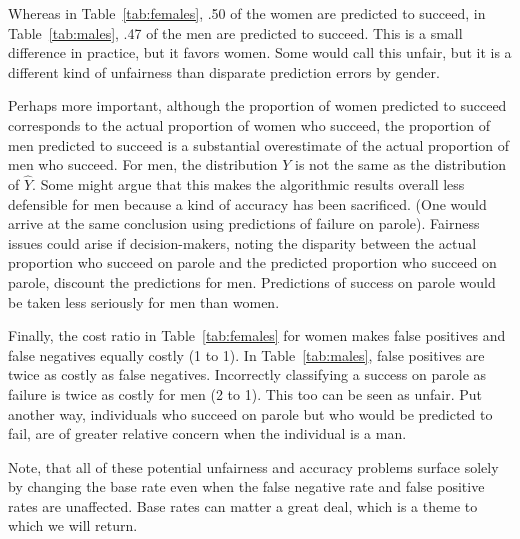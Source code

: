 \documentclass[12pt]{article}
\begin{document}
Whereas in Table~\ref{tab:females}, .50 of the women are predicted to succeed, in Table~\ref{tab:males}, .47 of the men are predicted to succeed. This is a small difference in practice, but it favors women. Some would call this unfair, but it is a different kind of unfairness than disparate prediction errors by gender. 

Perhaps more important, although the proportion of women predicted to succeed corresponds to the actual proportion of women who succeed, the proportion of men predicted to succeed is a substantial overestimate of the actual proportion of men who succeed. For men, the distribution $Y$ is not the same as the distribution of $\hat{Y}$. Some might argue that this makes the algorithmic results overall less defensible for men because a kind of accuracy has been sacrificed. (One would arrive at the same conclusion using predictions of failure on parole). Fairness issues could arise if decision-makers, noting the disparity between the actual proportion who succeed on parole and the predicted proportion who succeed on parole, discount the predictions for men. Predictions of success on parole would be taken less seriously for men than women. 

Finally, the cost ratio in Table~\ref{tab:females} for women makes false positives and false negatives equally costly (1 to 1). In Table~\ref{tab:males}, false positives are twice as costly as false negatives. Incorrectly classifying a success on parole as failure is twice as costly for men (2 to 1). This too can be seen as unfair. Put another way, individuals who succeed on parole but who would be predicted to fail, are of greater relative concern when the individual is a man.    

Note, that all of these potential unfairness and accuracy problems surface solely by changing the base rate even when the false negative rate and false positive rates are unaffected. Base rates can matter a great deal, which is a theme to which we will return.
\end{document}
